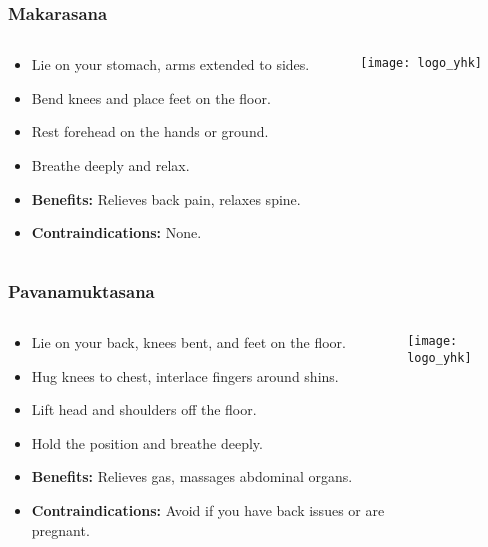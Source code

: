 \begin{frame}[fragile]\frametitle{Makarasana}
\begin{columns}
    \begin{column}[T]{0.5\linewidth}
      \begin{itemize}
        \item Lie on your stomach, arms extended to sides.
        \item Bend knees and place feet on the floor.
        \item Rest forehead on the hands or ground.
        \item Breathe deeply and relax.
        \item \textbf{Benefits:} Relieves back pain, relaxes spine.
        \item \textbf{Contraindications:} None.
      \end{itemize}
    \end{column}
    \begin{column}[T]{0.5\linewidth}
        \begin{center}
        \texttt{[image: logo\_yhk]}
        \end{center}    
    \end{column}
  \end{columns}
\end{frame}

\begin{frame}[fragile]\frametitle{Pavanamuktasana}
\begin{columns}
    \begin{column}[T]{0.5\linewidth}
      \begin{itemize}
        \item Lie on your back, knees bent, and feet on the floor.
        \item Hug knees to chest, interlace fingers around shins.
        \item Lift head and shoulders off the floor.
        \item Hold the position and breathe deeply.
        \item \textbf{Benefits:} Relieves gas, massages abdominal organs.
        \item \textbf{Contraindications:} Avoid if you have back issues or are pregnant.
      \end{itemize}
    \end{column}
    \begin{column}[T]{0.5\linewidth}
        \begin{center}
        \texttt{[image: logo\_yhk]}
        \end{center}    
    \end{column}
  \end{columns}
\end{frame}

